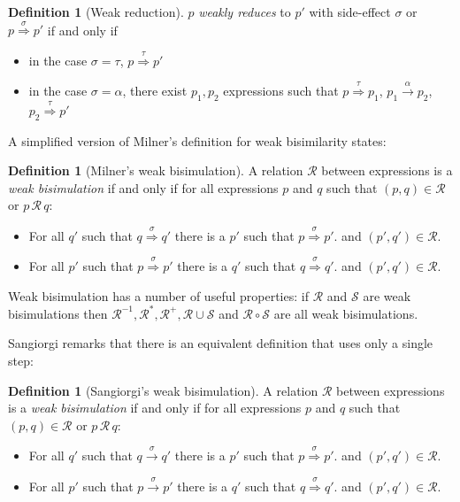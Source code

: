 \documentclass[12pt,twoside,notitlepage]{report}
\theoremstyle{plain}%
\theoremstyle{definition}
\newtheorem{defn}[thm]{Definition}
\theoremstyle{remark}
\begin{document}
\begin{defn}[Weak reduction]
$ p $ \textit{weakly reduces} to $ p' $ with side-effect $ \sigma $ or $ p \overset{\sigma}{\Rightarrow} p' $ if and only if 
\begin{itemize}
\item{in the case $ \sigma = \tau $, $ p \overset{\tau}{\Rightarrow} p' $}
\item{in the case $ \sigma = \alpha $, there exist $ p_1, p_2 $ expressions such that $ p \overset{\tau}{\Rightarrow} p_1 $, $ p_1 \overset{\alpha}{\rightarrow} p_2 $, $ p_2 \overset{\tau}{\Rightarrow} p' $}
\end{itemize}
\end{defn}

A simplified version of Milner's definition for weak bisimilarity states:
\begin{defn}[Milner's weak bisimulation]
A relation $ \mathcal{R} $ between expressions is a \textit{weak bisimulation} if and only if for all expressions $ p $ and $ q $ such that $ (p,q)\in \mathcal{R} $ or $ p\, \mathcal{R}\, q $:
\begin{itemize}
\item{For all $ q' $ such that $ q \overset{\sigma}{\Rightarrow} q' $ there is a $ p' $ such that $ p \overset{\sigma}{\Rightarrow} p' $. and $ (p', q') \in \mathcal{R}$. }
\item{For all $ p' $ such that $ p \overset{\sigma}{\Rightarrow} p' $ there is a $ q' $ such that $ q \overset{\sigma}{\Rightarrow} q' $. and $ (p', q') \in \mathcal{R}$. }
\end{itemize}
\end{defn}

Weak bisimulation has a number of useful properties: if $ \mathcal{R} $ and $ \mathcal{S} $ are weak bisimulations then $ \mathcal{R}^{-1}, \mathcal{R}^*, \mathcal{R}^+, \mathcal{R}\cup\mathcal{S}$  and $\mathcal{R} \circ \mathcal{S} $ are all weak bisimulations.

Sangiorgi\cite{sangiorgi1992problem} remarks that there is an equivalent definition that uses only a single step:
\begin{defn}[Sangiorgi's weak bisimulation]
A relation $ \mathcal{R} $ between expressions is a \textit{weak bisimulation} if and only if for all expressions $ p $ and $ q $ such that $ (p,q)\in \mathcal{R} $ or $ p\, \mathcal{R}\, q $:
\begin{itemize}
\item{For all $ q' $ such that $ q \overset{\sigma}{\rightarrow} q' $ there is a $ p' $ such that $ p \overset{\sigma}{\Rightarrow} p' $. and $ (p', q') \in \mathcal{R}$. }
\item{For all $ p' $ such that $ p \overset{\sigma}{\rightarrow} p' $ there is a $ q' $ such that $ q \overset{\sigma}{\Rightarrow} q' $. and $ (p', q') \in \mathcal{R}$. }
\end{itemize}
\end{defn}
\end{document}
